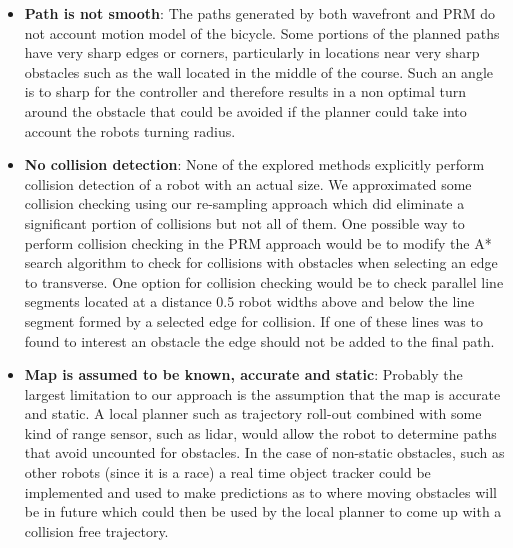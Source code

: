 \documentclass{article}
\begin{document}
\begin{itemize}

	\item{\textbf{Path is not smooth}: The paths generated by both wavefront and PRM do not account motion model of the bicycle. Some portions of the planned paths have very sharp edges or corners, particularly in locations near very sharp obstacles such as the wall located in the middle of the course. Such an angle is to sharp for the controller and therefore results in a non optimal turn around the obstacle that could be avoided if the planner could take into account the robots turning radius. 	
}
	
\item{\textbf{No collision detection}: None of the explored methods explicitly perform collision detection of a robot with an actual size. We approximated some collision checking using our re-sampling approach which did eliminate a significant portion of collisions but not all of them. One possible way to perform collision checking in the PRM approach would be to modify the A* search algorithm to check for collisions with obstacles when selecting an edge to transverse. One option for collision checking would be to check parallel line segments located at a distance 0.5 robot widths above and below the line segment formed by a selected edge for collision. If one of these lines was to found to interest an obstacle the edge should not be added to the final path.  
}

\item{\textbf{Map is assumed to be known, accurate and static}: Probably the largest limitation to our approach is the assumption that the map is accurate and static. A local planner such as trajectory roll-out combined with some kind of range sensor, such as lidar, would allow the robot to determine paths that avoid uncounted for obstacles. In the case of non-static obstacles, such as other robots (since it is a race) a real time object tracker could be implemented and used to make predictions as to where moving obstacles will be in future which could then be used by the local planner to come up with a collision free trajectory. 
}
	
\end{itemize}
\end{document}

